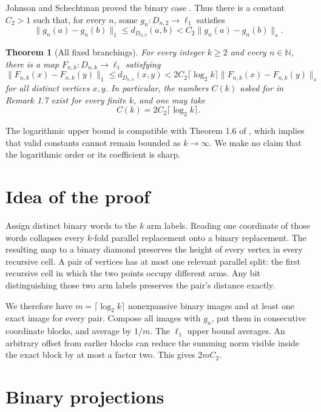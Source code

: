 \documentclass[11pt]{article}
\newtheorem{theorem}{Theorem}
\newcommand{\N}{\mathbb N}
\newcommand{\ellone}{\ell_1}
\newcommand{\snorm}[1]{\lVert #1\rVert_s}
\newcommand{\onorm}[1]{\lVert #1\rVert_1}
\begin{document}
Johnson and Schechtman proved the binary case \cite{JS}.  Thus there is a
constant $C_2>1$ such that, for every $n$, some
$g_n:D_{n,2}\to\ellone$ satisfies
\begin{equation}\label{eq:binary}
 \onorm{g_n(a)-g_n(b)}\le d_{D_{n,2}}(a,b)
 < C_2\snorm{g_n(a)-g_n(b)}.
\end{equation}

\begin{theorem}[All fixed branchings]\label{thm:main}
For every integer $k\ge2$ and every $n\in\N$, there is a map
$F_{n,k}:D_{n,k}\to\ellone$ satisfying
\[
 \onorm{F_{n,k}(x)-F_{n,k}(y)}\le d_{D_{n,k}}(x,y)
 < 2C_2\lceil\log_2 k\rceil
   \snorm{F_{n,k}(x)-F_{n,k}(y)}
\]
for all distinct vertices $x,y$.  In particular, the numbers $C(k)$ asked
for in Remark 1.7 exist for every finite $k$, and one may take
\[
                 C(k)=2C_2\lceil\log_2 k\rceil.
\]
\end{theorem}

The logarithmic upper bound is compatible with Theorem 1.6 of \cite{OR},
which implies that valid constants cannot remain bounded as $k\to\infty$.
We make no claim that the logarithmic order or its coefficient is sharp.

\section{Idea of the proof}

Assign distinct binary words to the $k$ arm labels.  Reading one coordinate
of those words collapses every $k$-fold parallel replacement onto a binary
replacement.  The resulting map to a binary diamond preserves the height of
every vertex in every recursive cell.  A pair of vertices has at most one
relevant parallel split: the first recursive cell in which the two points
occupy different arms.  Any bit distinguishing those two arm labels preserves
the pair's distance exactly.

We therefore have $m=\lceil\log_2 k\rceil$ nonexpansive binary images and at
least one exact image for every pair.  Compose all images with $g_n$, put them
in consecutive coordinate blocks, and average by $1/m$.  The $\ellone$ upper
bound averages.  An arbitrary offset from earlier blocks can reduce the
summing norm visible inside the exact block by at most a factor two.  This
gives $2mC_2$.

\section{Binary projections}
\end{document}
